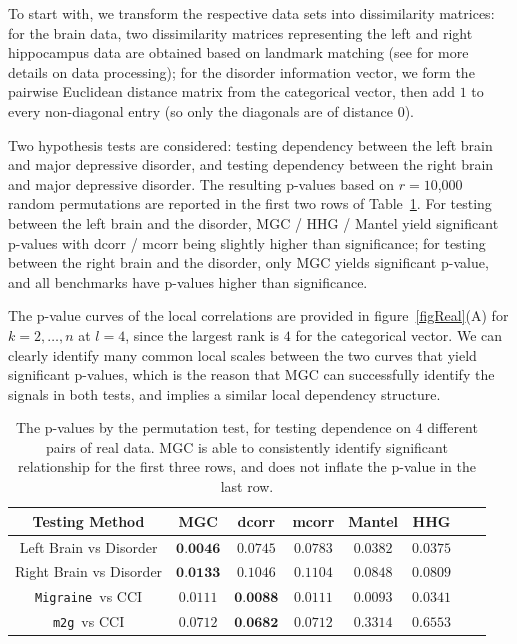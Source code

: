 \documentclass[11pt]{article}
\providecommand{\sct}[1]{{\sc \texttt{#1}}}
\newcommand{\Migraine}{\sct{Migraine}}
\newcommand{\mtg}{\sct{m2g}}
\begin{document}
To start with, we transform the respective data sets into dissimilarity matrices: for the brain data, two dissimilarity matrices representing the left and right hippocampus data are obtained based on landmark matching (see \cite{ParkEtAl2011} for more details on data processing); for the disorder information vector,
we form the pairwise Euclidean distance matrix from the categorical vector, then add $1$ to every non-diagonal entry (so only the diagonals are of distance $0$).

Two hypothesis tests are considered: testing dependency between the left brain and major depressive disorder, and testing dependency between the right brain and major depressive disorder. The resulting p-values based on $r=10$,$000$ random permutations are reported in the first two rows of Table~\ref{table1}. For testing between the left brain and the disorder, MGC / HHG / Mantel yield significant p-values with dcorr / mcorr being slightly higher than significance; for testing between the right brain and the disorder, only MGC yields significant p-value, and all benchmarks have p-values higher than significance. 

The p-value curves of the local correlations are provided in figure~\ref{figReal}(A) for $k=2,\ldots,n$ at $l=4$, since the largest rank is $4$ for the categorical vector. We can clearly identify many common local scales between the two curves that yield significant p-values, which is the reason that MGC can successfully identify the signals in both tests, and implies a similar local dependency structure. 

\begin{table}[!t]
\Large
\renewcommand{\arraystretch}{0.5}
\centering
{\begin{tabular}{|c||c|c|c|c|c|c|c|}
\hline
Testing Method & MGC & dcorr & mcorr & Mantel & HHG \\
\hline
Left Brain vs Disorder  & $\textbf{0.0046}$ & $0.0745$ & $0.0783$ & $0.0382$ & $0.0375$ \\
\hline
Right Brain vs Disorder & $\textbf{0.0133}$ & $0.1046$ & $0.1104$  & $0.0848$ & $0.0809$\\
\hline
\Migraine~vs CCI & $0.0111$ & $\textbf{0.0088}$ & $0.0111$  & $0.0093$ & $0.0341$\\
\hline
\mtg~vs CCI & $0.0712$ & $\textbf{0.0682}$ & $0.0712$  & $0.3314$ & $0.6553$\\
\hline
\end{tabular}
\caption{The p-values by the permutation test, for testing dependence on $4$ different pairs of real data. MGC is able to consistently identify significant relationship for the first three rows, and does not inflate the p-value in the last row.}
\label{table1}
}
\end{table}
\end{document}
